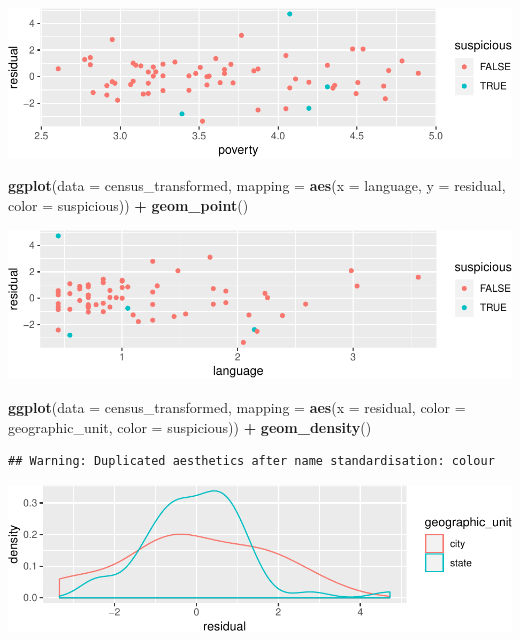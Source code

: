 \documentclass[landscape]{article}
\newenvironment{Shaded}{\begin{snugshade}}{\end{snugshade}}
\newcommand{\KeywordTok}[1]{\textcolor[rgb]{0.13,0.29,0.53}{\textbf{#1}}}
\newcommand{\DataTypeTok}[1]{\textcolor[rgb]{0.13,0.29,0.53}{#1}}
\newcommand{\StringTok}[1]{\textcolor[rgb]{0.31,0.60,0.02}{#1}}
\newcommand{\OperatorTok}[1]{\textcolor[rgb]{0.81,0.36,0.00}{\textbf{#1}}}
\newcommand{\NormalTok}[1]{#1}
\begin{document}
\includegraphics{20190422_multicollinearity_files/figure-latex/unnamed-chunk-22-2.pdf}

\begin{Shaded}
\begin{Highlighting}[]
\KeywordTok{ggplot}\NormalTok{(}\DataTypeTok{data =}\NormalTok{ census_transformed, }\DataTypeTok{mapping =} \KeywordTok{aes}\NormalTok{(}\DataTypeTok{x =}\NormalTok{ language, }\DataTypeTok{y =}\NormalTok{ residual, }\DataTypeTok{color =}\NormalTok{ suspicious)) }\OperatorTok{+}
\StringTok{  }\KeywordTok{geom_point}\NormalTok{()}
\end{Highlighting}
\end{Shaded}

\includegraphics{20190422_multicollinearity_files/figure-latex/unnamed-chunk-22-3.pdf}

\begin{Shaded}
\begin{Highlighting}[]
\KeywordTok{ggplot}\NormalTok{(}\DataTypeTok{data =}\NormalTok{ census_transformed, }\DataTypeTok{mapping =} \KeywordTok{aes}\NormalTok{(}\DataTypeTok{x =}\NormalTok{ residual, }\DataTypeTok{color =}\NormalTok{ geographic_unit, }\DataTypeTok{color =}\NormalTok{ suspicious)) }\OperatorTok{+}
\StringTok{  }\KeywordTok{geom_density}\NormalTok{()}
\end{Highlighting}
\end{Shaded}

\begin{verbatim}
## Warning: Duplicated aesthetics after name standardisation: colour
\end{verbatim}

\includegraphics{20190422_multicollinearity_files/figure-latex/unnamed-chunk-22-4.pdf}
\end{document}
